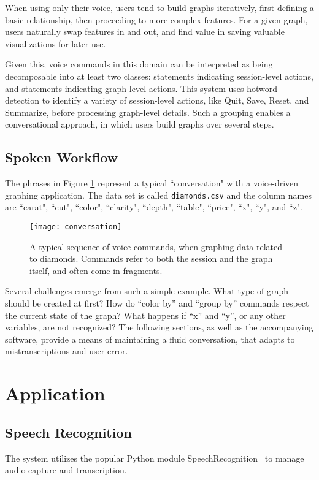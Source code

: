 \documentclass[11pt]{article}
\begin{document}
When using only their voice, users tend to build graphs iteratively, first defining a basic relationship, then proceeding to more complex features. For a given graph, users naturally swap features in and out, and find value in saving valuable visualizations for later use.

Given this, voice commands in this domain can be interpreted as being decomposable into at least two classes: statements indicating session-level actions, and statements indicating graph-level actions. This system uses hotword detection to identify a variety of session-level actions, like Quit, Save, Reset, and Summarize, before processing graph-level details. Such a grouping enables a conversational approach, in which users build graphs over several steps.

\subsection{Spoken Workflow}
The phrases in Figure \ref{fig:conversation} represent a typical ``conversation" with a voice-driven graphing application. The data set is called \texttt{diamonds.csv} and the column names are ``carat", ``cut", ``color", ``clarity", ``depth", ``table", ``price", ``x", ``y", and ``z".

\begin{figure}[ht]
\texttt{[image: conversation]}
\caption{A typical sequence of voice commands, when graphing data related to diamonds. Commands refer to both the session and the graph itself, and often come in fragments.}
\label{fig:conversation}
\end{figure}

\vspace{1em}
Several challenges emerge from such a simple example. What type of graph should be created at first? How do ``color by'' and ``group by'' commands respect the current state of the graph? What happens if ``x'' and ``y'', or any other variables, are not recognized? The following sections, as well as the accompanying software, provide a means of maintaining a fluid conversation, that adapts to mistranscriptions and user error.


\section{Application}

\subsection{Speech Recognition}
The system utilizes the popular Python module SpeechRecognition~\cite{Zhang:16} to manage audio
capture and transcription.
\end{document}
